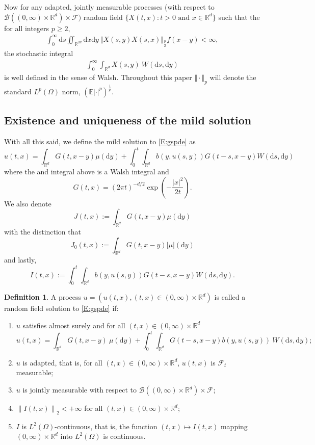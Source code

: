\documentclass[a4paper,11pt]{article}%
\numberwithin{equation}{section}
\theoremstyle{plain}
\theoremstyle{definition}
\newtheorem{definition}[theorem]{Definition}
\newcommand{\R}{\mathbb{R}}
\newcommand{\E}{\mathbb{E}}
\newcommand{\Norm}[1]{\left\|  #1   \right\|}
\newcommand{\ud}{\ensuremath{ \mathrm{d} }}
\begin{document}
Now for any adapted, jointly measurable processes (with respect to $\mathcal B((0,\infty)\times \R^d)\times \mathcal F)$
random field $\{X(t,x): t>0 \text{ and } x \in \R^d\}$ such that the for all integers $p \ge 2$,
\begin{align*}
	\int_0^\infty\ud s\iint_{\R^{2d}} \ud x \ud y \: \Vert X(s,y)X(s,x) \Vert_{\frac{p}{2}}f(x-y) < \infty,
\end{align*}
the stochastic integral
\begin{align*}
	\int_0^\infty \int_{\R^d} X(s,y)\: W(\ud s, \ud y)
\end{align*}
is well defined in the sense of Walsh. Throughout this paper $\Vert \cdot \Vert_p$ will denote the standard
$L^p(\Omega)$ norm, $\left(\E|\cdot|^p\right)^{\frac{1}{p}}$.

\subsection{Existence and uniqueness of the mild solution}

With all this said, we define the mild solution to \eqref{E:gspde} as
\begin{equation}
	u(t,x)=\int_{\R^d}G(t,x-y)\mu(\ud y) + \int_0^t\int_{\R^d}b(y,u(s,y))G(t-s,x-y)W(\ud s,\ud y) \label{E:gmsol}
\end{equation}
where the and integral above is a Walsh integral and
\[
	 G(t,x) = (2 \pi t)^{-d/2}\exp\left( -\dfrac{|x|^2}{2t} \right).
\]
We also denote
\[
	 J(t,x) := \int_{\R^d}G(t,x-y)\mu(\ud y)
\]
with the distinction that
\[
	J_0(t,x) := \int_{\R^d}G(t,x-y)|\mu|(\ud y)
\]
and lastly,
\[
	 I(t,x):= \int_0^t\int_{\R^d}b(y,u(s,y))G(t-s,x-y)W(\ud s,\ud y).
\]
\begin{definition}
	\label{D:Sol}
	A process $u=(u(t,x),(t,x)\in (0,\infty)\times \R^d)$ is called a random field solution to \eqref{E:gspde} if:
	\begin{enumerate}
		\item $u$ satisfies almost surely and for all $(t,x) \in (0,\infty)\times \R^d$
			\[
				u(t,x) = \int_{\R^d}G(t,x-y)\:\mu( \ud y) +
				\int_0^t\int_{\R^d}G(t-s,x-y)b(y,u(s,y)) \:
				W(\ud s, \ud y);
			\]
		\item $u$ is adapted, that is, for all $(t,x) \in (0,\infty)\times \R^d$, $u(t,x)$ is $\mathcal F_t$ measurable;
		\item $u$ is jointly measurable with respect to $\mathcal B((0,\infty)\times \R^d) \times \mathcal F$;
		\item $\Norm{I(t,x)}_2 < + \infty $ for all $(t,x) \in (0,\infty)\times \R^d$;
		\item $I$ is $L^2(\Omega)$-continuous, that is, the function $(t,x) \mapsto I(t,x)$ mapping $(0,\infty)\times \R^d$ into $L^2(\Omega)$ is continuous.
	\end{enumerate}
\end{definition}
\end{document}
